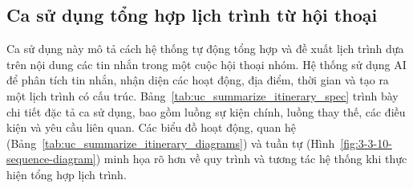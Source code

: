\subsection{Ca sử dụng tổng hợp lịch trình từ hội thoại}
\noindent Ca sử dụng này mô tả cách hệ thống tự động tổng hợp và đề xuất lịch trình dựa trên nội dung các tin nhắn trong một cuộc hội thoại nhóm. Hệ thống sử dụng AI để phân tích tin nhắn, nhận diện các hoạt động, địa điểm, thời gian và tạo ra một lịch trình có cấu trúc. Bảng~\ref{tab:uc_summarize_itinerary_spec} trình bày chi tiết đặc tả ca sử dụng, bao gồm luồng sự kiện chính, luồng thay thế, các điều kiện và yêu cầu liên quan. Các biểu đồ hoạt động, quan hệ (Bảng~\ref{tab:uc_summarize_itinerary_diagrams}) và tuần tự (Hình~\ref{fig:3-3-10-sequence-diagram}) minh họa rõ hơn về quy trình và tương tác hệ thống khi thực hiện tổng hợp lịch trình.

